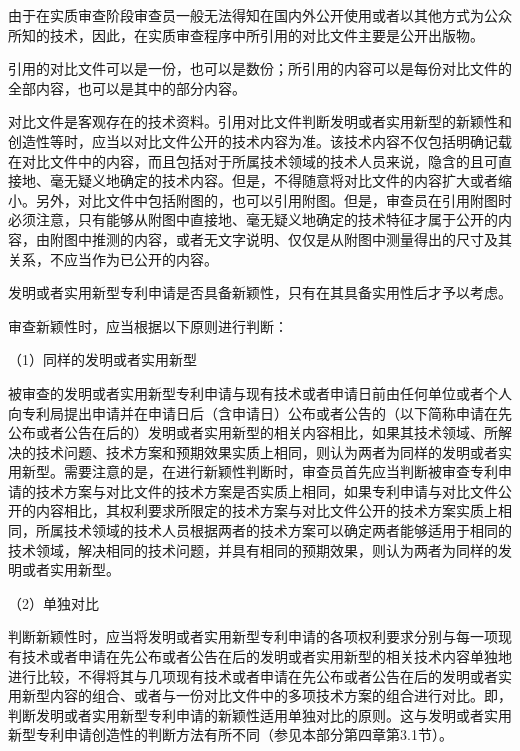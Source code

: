 由于在实质审查阶段审查员一般无法得知在国内外公开使用或者以其他方式为公众所知的技术，因此，在实质审查程序中所引用的对比文件主要是公开出版物。

引用的对比文件可以是一份，也可以是数份；所引用的内容可以是每份对比文件的全部内容，也可以是其中的部分内容。

对比文件是客观存在的技术资料。引用对比文件判断发明或者实用新型的新颖性和创造性等时，应当以对比文件公开的技术内容为准。该技术内容不仅包括明确记载在对比文件中的内容，而且包括对于所属技术领域的技术人员来说，隐含的且可直接地、毫无疑义地确定的技术内容。但是，不得随意将对比文件的内容扩大或者缩小。另外，对比文件中包括附图的，也可以引用附图。但是，审查员在引用附图时必须注意，只有能够从附图中直接地、毫无疑义地确定的技术特征才属于公开的内容，由附图中推测的内容，或者无文字说明、仅仅是从附图中测量得出的尺寸及其关系，不应当作为已公开的内容。

发明或者实用新型专利申请是否具备新颖性，只有在其具备实用性后才予以考虑。

审查新颖性时，应当根据以下原则进行判断：

{\setlength{\parindent}{17.1bp}（1）同样的发明或者实用新型\par}

被审查的发明或者实用新型专利申请与现有技术或者申请日前由任何单位或者个人向专利局提出申请并在申请日后（含申请日）公布或者公告的（以下简称申请在先公布或者公告在后的）发明或者实用新型的相关内容相比，如果其技术领域、所解决的技术问题、技术方案和预期效果实质上相同，则认为两者为同样的发明或者实用新型。需要注意的是，在进行新颖性判断时，审查员首先应当判断被审查专利申请的技术方案与对比文件的技术方案是否实质上相同，如果专利申请与对比文件公开的内容相比，其权利要求所限定的技术方案与对比文件公开的技术方案实质上相同，所属技术领域的技术人员根据两者的技术方案可以确定两者能够适用于相同的技术领域，解决相同的技术问题，并具有相同的预期效果，则认为两者为同样的发明或者实用新型。

{\setlength{\parindent}{17.1bp}（2）单独对比\par}

判断新颖性时，应当将发明或者实用新型专利申请的各项权利要求分别与每一项现有技术或者申请在先公布或者公告在后的发明或者实用新型的相关技术内容单独地进行比较，不得将其与几项现有技术或者申请在先公布或者公告在后的发明或者实用新型内容的组合、或者与一份对比文件中的多项技术方案的组合进行对比。即，判断发明或者实用新型专利申请的新颖性适用单独对比的原则。这与发明或者实用新型专利申请创造性的判断方法有所不同（参见本部分第四章第3.1节）。


